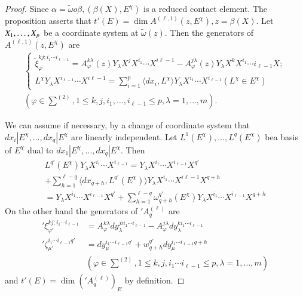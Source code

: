 \begin{proof}
  Since $\alpha = \tilde{\omega} o \beta , (\beta (X), E^{\chi})$ is a
  reduced contact element. The proposition asserts that $t' (E) = \dim
  A^{(\ell ,1)} (z,E^{\chi}), z = \beta (X)$. Let $X_1, \ldots,\break X_p$
  be a coordinate  system at $\tilde{\omega}(z)$. Then the generators
  of $A^{(\ell,1)} (z,E^{\chi})$ are  
  \begin{multline*}
  \begin{cases}
    \tilde{\xi}^{kj;i_1 \cdots i_{\ell -1}}_\varphi = A_{\varphi}^{k \lambda}
    (z) Y_{\lambda} X^j X^{i_1} \cdots X^{i \ell -1 } - A_{\varphi} ^{j
      \lambda} (z) Y_{\lambda} X^k X^{i_1} \cdots i_{\ell -1} X;\\ 
    L^{\chi} Y_{\lambda} X^{i_{\ell-1}} \cdots X^{i \ell -1} = \sum_{i=1}^{p}
    \langle dx_i , L^{\chi}\rangle Y_{\lambda} X^{i_1} \cdots X^{i_{\ell-1}} (L
    ^{\chi} \in E^{\chi}) 
  \end{cases}\\
  (\varphi \in {\textstyle \sum^{(2)}}, 1 \leq k,j,i_1, \ldots,i_{\ell -1} \leq p,
  \lambda =1, \ldots , m). 
  \end{multline*}
  
  We can assume if necessary, by a change of coordinate system that
  $dx_i |E^{\chi},\ldots , dx_q|E^{\chi}$ are linearly independent. Let
  $L^1 (E^{\chi}),\ldots , L^q (E^{\chi})$ be\pageoriginale a basis of $E^{\chi}$ dual
  to $dx_1 |E^{\chi} , \ldots, dx_q| E^{\chi}$. Then  
  \begin{multline*}
    L^{q'} (E^{\chi}) Y_{\lambda}X^{i_1}\cdots X^{i_{\ell-1}} = Y_{\lambda}
    X^{i_1}\cdots X^{i_{\ell-1}} X^{q'}\\ 
    + \sum_{h=1}^{\ell-q}
    \langle dx_{q+h}, L^{q'} (E^{\chi})\rangle
    Y_{\lambda}X^{i_1}\cdots X^{i \ell-1} X^{q+h}\\ 
    = Y_{\lambda}X^{i_1}\cdots X^{i_{\ell-1}} X^{q'} + \sum_{h=1}^{\ell
      -q} \omega^{q'}_{q+h} (E^{\chi}) Y_{\lambda} X^{i_1}\cdots X^{i_{\ell-1}}
    X^{q+h} 
  \end{multline*}
  On the other hand the generators of $'A_q^{(\ell)}$ are
  \begin{align*}
    {'\xi}_{\varphi'}^{kj;i_1 \cdots i_{\ell -1}} &= A_{\varphi}^{k
      \lambda} dy_{\lambda}^{jii_1 \cdots i_{\ell -1}}  - A_{\varphi}
    ^{j \lambda} dy_{\lambda}^{ki_1 \cdots i_{\ell -1}}\\ 
    {'\zeta}_{\mu'}^{i_{1} \cdots i_{\ell -1} q'} &= dy_{\mu}^{i_1 \cdots
      i_{\ell -1} q'} + w^{q'}_{q+h} dy_{\mu}^{i_1 \cdots i_{\ell -1}
      q+h}\\
    & (\varphi \in {\textstyle \sum^{(2)}}, 1 \leq k , j, i_1 \cdots
    i_{\ell -1} \leq p, \lambda=1, \ldots , m) 
  \end{align*}
  and $t'(E)=\dim ('A_q^{(\ell)})_E$ by definition. 
\end{proof}

